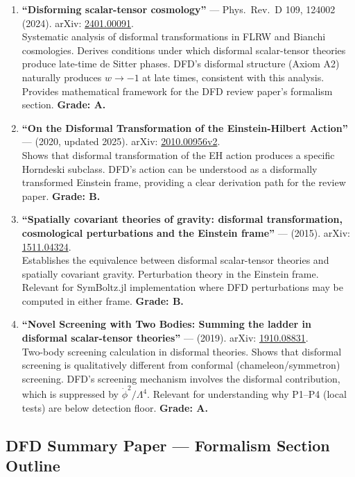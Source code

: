\documentclass[11pt,a4paper]{article}
\begin{document}
\begin{enumerate}
\item \textbf{``Disforming scalar-tensor cosmology''} --- Phys.\ Rev.\ D 109, 124002 (2024). arXiv: \href{https://arxiv.org/abs/2401.00091}{2401.00091}.\\
Systematic analysis of disformal transformations in FLRW and Bianchi cosmologies. Derives conditions under which disformal scalar-tensor theories produce late-time de Sitter phases. DFD's disformal structure (Axiom A2) naturally produces $w \to -1$ at late times, consistent with this analysis. Provides mathematical framework for the DFD review paper's formalism section. \textbf{Grade: A.}

\item \textbf{``On the Disformal Transformation of the Einstein-Hilbert Action''} --- (2020, updated 2025). arXiv: \href{https://arxiv.org/abs/2010.00956}{2010.00956v2}.\\
Shows that disformal transformation of the EH action produces a specific Horndeski subclass. DFD's action can be understood as a disformally transformed Einstein frame, providing a clear derivation path for the review paper. \textbf{Grade: B.}

\item \textbf{``Spatially covariant theories of gravity: disformal transformation, cosmological perturbations and the Einstein frame''} --- (2015). arXiv: \href{https://arxiv.org/abs/1511.04324}{1511.04324}.\\
Establishes the equivalence between disformal scalar-tensor theories and spatially covariant gravity. Perturbation theory in the Einstein frame. Relevant for SymBoltz.jl implementation where DFD perturbations may be computed in either frame. \textbf{Grade: B.}

\item \textbf{``Novel Screening with Two Bodies: Summing the ladder in disformal scalar-tensor theories''} --- (2019). arXiv: \href{https://arxiv.org/abs/1910.08831}{1910.08831}.\\
Two-body screening calculation in disformal theories. Shows that disformal screening is qualitatively different from conformal (chameleon/symmetron) screening. DFD's screening mechanism involves the disformal contribution, which is suppressed by $\dot\phi^2/\Lambda^4$. Relevant for understanding why P1--P4 (local tests) are below detection floor. \textbf{Grade: A.}
\end{enumerate}

\subsection{DFD Summary Paper --- Formalism Section Outline}
\end{document}
